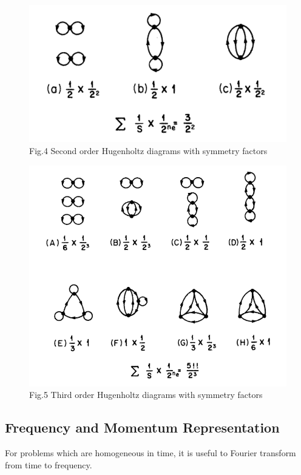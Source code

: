 \documentclass[12pt]{article}
\begin{document}
\begin{figure}[H]
    \centering
    \includegraphics[width=12cm]{p8.png}
    \caption*{Fig.4 Second order Hugenholtz diagrams with symmetry factors}
    \label{}
\end{figure}
\begin{figure}[H]
    \centering
    \includegraphics[width=12cm]{p9.png}
    \caption*{Fig.5 Third order Hugenholtz diagrams with symmetry factors}
    \label{}
\end{figure}
\subsection*{Frequency and Momentum Representation}
For problems which are homogeneous in time, it is useful to Fourier transform from 
time to frequency.
\end{document}
